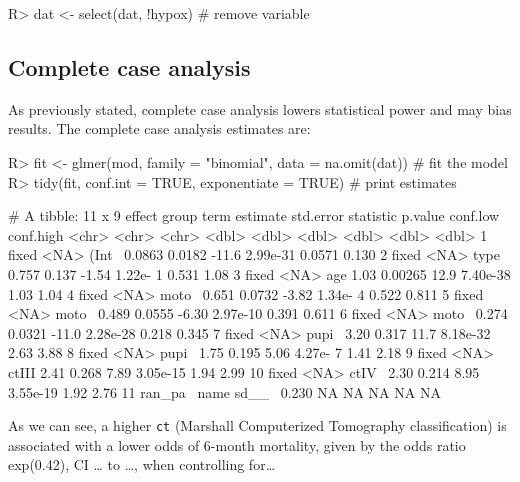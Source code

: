 \documentclass[
]{jss}
\begin{document}
\begin{CodeChunk}
\begin{CodeInput}
R> dat <- select(dat, !hypox)  # remove variable
\end{CodeInput}
\end{CodeChunk}

\hypertarget{complete-case-analysis}{%
\subsection{Complete case analysis}\label{complete-case-analysis}}

As previously stated, complete case analysis lowers statistical power
and may bias results. The complete case analysis estimates are:

\begin{CodeChunk}
\begin{CodeInput}
R> fit <- glmer(mod, family = "binomial", data = na.omit(dat)) # fit the model
R> tidy(fit, conf.int = TRUE, exponentiate = TRUE)             # print estimates
\end{CodeInput}
\begin{CodeOutput}
# A tibble: 11 x 9
   effect  group term  estimate std.error statistic   p.value conf.low conf.high
   <chr>   <chr> <chr>    <dbl>     <dbl>     <dbl>     <dbl>    <dbl>     <dbl>
 1 fixed   <NA>  (Int~   0.0863   0.0182     -11.6   2.99e-31   0.0571     0.130
 2 fixed   <NA>  type~   0.757    0.137       -1.54  1.22e- 1   0.531      1.08 
 3 fixed   <NA>  age     1.03     0.00265     12.9   7.40e-38   1.03       1.04 
 4 fixed   <NA>  moto~   0.651    0.0732      -3.82  1.34e- 4   0.522      0.811
 5 fixed   <NA>  moto~   0.489    0.0555      -6.30  2.97e-10   0.391      0.611
 6 fixed   <NA>  moto~   0.274    0.0321     -11.0   2.28e-28   0.218      0.345
 7 fixed   <NA>  pupi~   3.20     0.317       11.7   8.18e-32   2.63       3.88 
 8 fixed   <NA>  pupi~   1.75     0.195        5.06  4.27e- 7   1.41       2.18 
 9 fixed   <NA>  ctIII   2.41     0.268        7.89  3.05e-15   1.94       2.99 
10 fixed   <NA>  ctIV~   2.30     0.214        8.95  3.55e-19   1.92       2.76 
11 ran_pa~ name  sd__~   0.230   NA           NA    NA         NA         NA    
\end{CodeOutput}
\end{CodeChunk}

As we can see, a higher \texttt{ct} (Marshall Computerized Tomography
classification) is associated with a lower odds of 6-month mortality,
given by the odds ratio exp(0.42), CI \ldots{} to \ldots, when
controlling for\ldots{}
\end{document}

